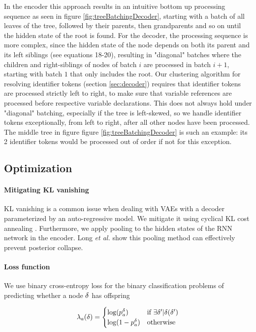 In the encoder this approach results in an intuitive bottom up processing sequence as seen in figure \ref{fig:treeBatchingDecoder}, starting with a batch of all leaves of the tree, followed by their parents, then grandparents and so on until the hidden state of the root is found.
For the decoder, the processing sequence is more complex, since the hidden state of the node depends on both its parent and its left siblings (see equations 18-20), resulting in "diagonal" batches where the children and right-siblings of nodes of batch $i$ are processed in batch $i+1$, starting with batch $1$ that only includes the root.
Our clustering algorithm for resolving identifier tokens (section \ref{sec:decoder}) requires that identifier tokens are processed strictly left to right, to make sure that variable references are processed before respective variable declarations.
This does not always hold under "diagonal" batching, especially if the tree is left-skewed, so we handle identifier tokens exceptionally, from left to right, after all other nodes have been processed.
The middle tree in figure figure \ref{fig:treeBatchingDecoder} is such an example: its 2 identifier tokens would be processed out of order if not for this exception.

\subsection{Optimization}

\paragraph{Mitigating KL vanishing}
KL vanishing is a common issue when dealing with VAEs with a decoder parameterized by an auto-regressive model.
We mitigate it using cyclical KL cost annealing \cite{fuCyclicalAnnealingSchedule2019}. 
Furthermore, we apply pooling to the hidden states of the RNN network in the encoder. Long \textit{et al.} \cite{longPreventingPosteriorCollapse2019} show this pooling method can effectively prevent posterior collapse. 

\paragraph{Loss function}
We use binary cross-entropy loss for the binary classification problems of predicting whether a node $\delta$ has offspring

\begin{align}
    \lambda_{a}(\delta) = \begin{cases}
        \log(p^\delta_a) & \text{if }\exists \delta' | \delta(\delta') \\
        \log(1- p^\delta_a) & \text{otherwise}
    \end{cases}
\end{align}

